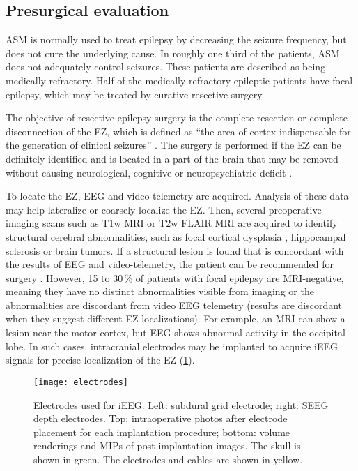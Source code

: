\subsection{Presurgical evaluation}

\Ac{ASM} is normally used to treat epilepsy by decreasing the seizure frequency, but does not cure the underlying cause.
In roughly one third of the patients, \ac{ASM} does not adequately control seizures.
These patients are described as being medically refractory.
Half of the medically refractory epileptic patients have focal epilepsy, which may be treated by curative resective surgery.

The objective of resective epilepsy surgery is the complete resection or complete disconnection of the \ac{EZ}, which is defined as ``the area of cortex indispensable for the generation of clinical seizures'' \cite{rosenow_presurgical_2001}.
The surgery is performed if the \ac{EZ} can be definitely identified and is located in a part of the brain that may be removed without causing neurological, cognitive or neuropsychiatric deficit \cite{jobst_resective_2015}.

To locate the \ac{EZ}, \ac{EEG} and video-telemetry are acquired.
Analysis of these data may help lateralize or coarsely localize the \ac{EZ}.
Then, several preoperative imaging scans such as \ac{T1w} \ac{MRI} or \ac{T2w} \ac{FLAIR} \ac{MRI} are acquired to identify structural cerebral abnormalities, such as focal cortical dysplasia \cite{kabat_focal_2012}, hippocampal sclerosis \cite{thom_review_2014} or brain tumors.
If a structural lesion is found that is concordant with the results of \ac{EEG} and video-telemetry, the patient can be recommended for surgery \cite{duncan_brain_2016}.
However, 15 to 30\,\% of patients with focal epilepsy are \ac{MRI}-negative, meaning they have no distinct abnormalities visible from imaging or the abnormalities are discordant from video \ac{EEG} telemetry \cite{bien_characteristics_2009} (results are discordant when they suggest different \ac{EZ} localizations).
For example, an \ac{MRI} can show a lesion near the motor cortex, but \ac{EEG} shows abnormal activity in the occipital lobe.
In such cases, intracranial electrodes may be implanted to acquire \ac{iEEG} signals for precise localization of the \ac{EZ} (\cref{fig:electrodes}).

\begin{figure}[hbt!]
  \centering
  \texttt{[image: electrodes]}
  \caption[Electrodes used for intracranial EEG]{
    Electrodes used for \acf{iEEG}.
    Left: subdural grid electrode;
    right: \acf{SEEG} depth electrodes.
    Top: intraoperative photos after electrode placement for each implantation procedure;
    bottom: volume renderings and \acfp{MIP} of post-implantation images.
    The skull is shown in green.
    The electrodes and cables are shown in yellow.
  }\label{fig:electrodes}
\end{figure}

